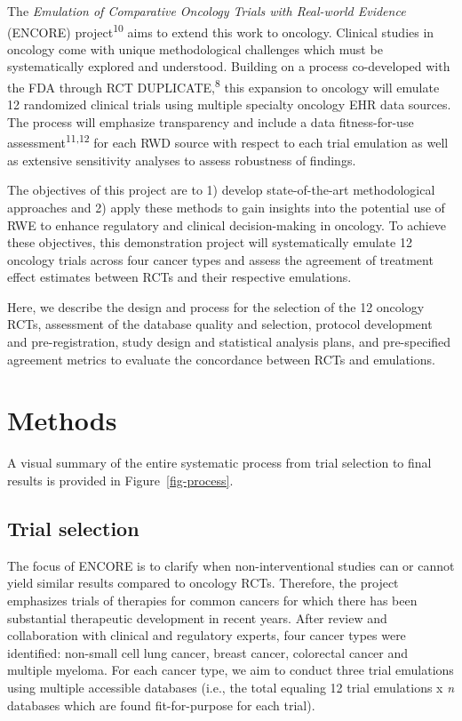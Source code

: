\documentclass[
  letterpaper,
  DIV=11,
  numbers=noendperiod]{scrartcl}
\begin{document}
The \emph{Emulation of Comparative Oncology Trials with Real-world
Evidence} (ENCORE) project\textsuperscript{10} aims to extend this work
to oncology. Clinical studies in oncology come with unique
methodological challenges which must be systematically explored and
understood. Building on a process co-developed with the FDA through RCT
DUPLICATE,\textsuperscript{8} this expansion to oncology will emulate 12
randomized clinical trials using multiple specialty oncology EHR data
sources. The process will emphasize transparency and include a data
fitness-for-use assessment\textsuperscript{11,12} for each RWD source
with respect to each trial emulation as well as extensive sensitivity
analyses to assess robustness of findings.

The objectives of this project are to 1) develop state-of-the-art
methodological approaches and 2) apply these methods to gain insights
into the potential use of RWE to enhance regulatory and clinical
decision-making in oncology. To achieve these objectives, this
demonstration project will systematically emulate 12 oncology trials
across four cancer types and assess the agreement of treatment effect
estimates between RCTs and their respective emulations.

Here, we describe the design and process for the selection of the 12
oncology RCTs, assessment of the database quality and selection,
protocol development and pre-registration, study design and statistical
analysis plans, and pre-specified agreement metrics to evaluate the
concordance between RCTs and emulations.

\section{Methods}\label{methods}

A visual summary of the entire systematic process from trial selection
to final results is provided in Figure~\ref{fig-process}.

\subsection{Trial selection}\label{trial-selection}

The focus of ENCORE is to clarify when non-interventional studies can or
cannot yield similar results compared to oncology RCTs. Therefore, the
project emphasizes trials of therapies for common cancers for which
there has been substantial therapeutic development in recent years.
After review and collaboration with clinical and regulatory experts,
four cancer types were identified: non-small cell lung cancer, breast
cancer, colorectal cancer and multiple myeloma. For each cancer type, we
aim to conduct three trial emulations using multiple accessible
databases (i.e., the total equaling 12 trial emulations x \emph{n}
databases which are found fit-for-purpose for each trial).
\end{document}

